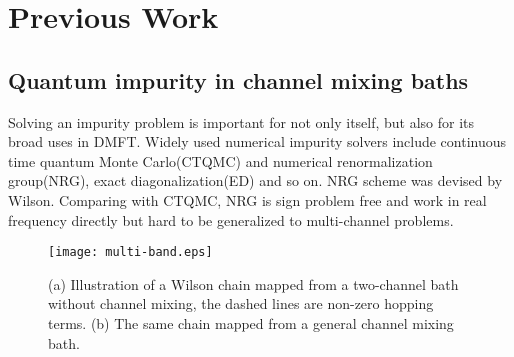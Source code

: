 \documentclass[a4paper]{article}
\newcommand{\<}{\langle}
\renewcommand{\>}{\rangle}
\begin{document}

\section{Previous Work}
\subsection{Quantum impurity in channel mixing baths}
Solving an impurity problem is important for not only itself, but also for its broad uses in DMFT.
Widely used numerical impurity solvers include continuous time quantum Monte Carlo(CTQMC) and numerical renormalization group(NRG), exact diagonalization(ED) and so on.
NRG scheme was devised by Wilson. Comparing with CTQMC, NRG is sign problem free and work in real frequency directly but hard to be generalized to multi-channel problems.
\begin{figure}
    \begin{center}
    \texttt{[image: multi-band.eps]}
    \end{center}
\caption{(a) Illustration of a Wilson chain mapped from a two-channel bath without channel mixing, the dashed lines are non-zero hopping terms.
(b) The same chain mapped from a general channel mixing bath.}\label{wilsonchain}
\end{figure}
\end{document}
